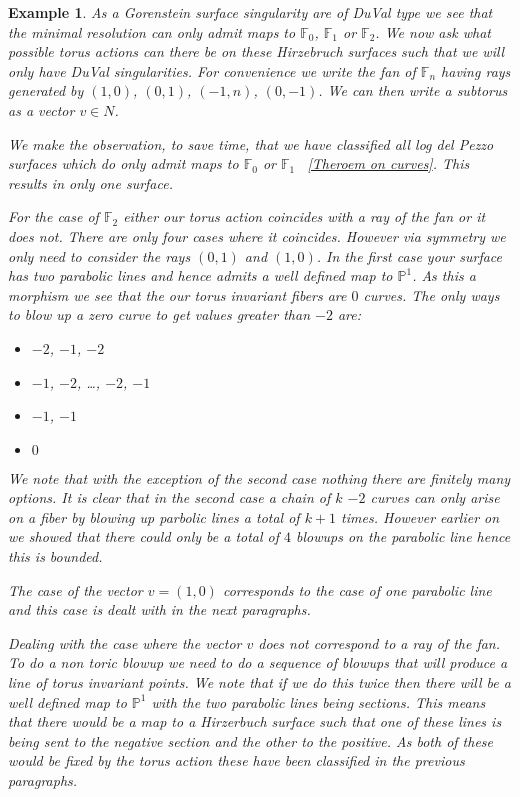 \documentclass[11pt]{amsart}
\theoremstyle{plain}
\newtheorem{ex}[thm]{Example}
\newcommand{\mb}[1]{\mathbb{#1}}
\begin{document}
\begin{ex}
As a Gorenstein surface singularity are of DuVal type we see that the minimal resolution can only admit maps to $\mb{F}_0$, $\mb{F}_1$ or $\mb{F}_2$. We now ask what possible torus actions can there be on these Hirzebruch surfaces such that we will only have DuVal singularities. For convenience we write the fan of $\mb{F}_n$ having rays generated by $(1,0)$, $(0,1)$, $(-1, n)$, $(0,-1)$. We can then write a subtorus as a vector $v \in N$.


We make the observation, to save time, that we have classified all log del Pezzo surfaces which do only admit maps to $\mb{F}_0$ or $\mb{F}_1$ ~\ref{Theroem on curves}. This results in only one surface.


For the case of $\mb{F}_2$ either our torus action coincides with a ray of the fan or it does not. There are only four cases where it coincides. However via symmetry we only need to consider the rays $(0,1)$ and $(1,0)$. In the first case your surface has two parabolic lines and hence admits a well defined map to $\mb{P}^1$. As this a morphism we see that the our torus invariant fibers are $0$ curves. The only ways to blow up a zero curve to get values greater than $-2$ are:
\begin{itemize}
\item $-2$, $-1$, $-2$
\item $-1$, $-2$, \dots , $-2$, $-1$
\item $-1$, $-1$
\item $0$
\end{itemize}
We note that with the exception of the second case nothing there are finitely many options. It is clear that in the second case a chain of $k$ $-2$ curves can only arise on a fiber by blowing up parbolic lines a total of $k+1$ times. However earlier on we showed that there could only be a total of $4$ blowups on the parabolic line hence this is bounded.  


The case of the vector $v = (1,0)$ corresponds to the case of one parabolic line and this case is dealt with in the next paragraphs.


Dealing with the case where the vector $v$ does not correspond to a ray of the fan. To do a non toric blowup we need to do a  sequence of blowups that will produce a line of torus invariant points. We note that if we do this twice then there will be a well defined map to $\mb{P}^1$ with the two parabolic lines being sections. This means that there would be a map to a Hirzerbuch surface such that one of these lines is being sent to the negative section and the other to the positive. As both of these would be fixed by the torus action these have been classified in the previous paragraphs.



\end{ex}
\end{document}
